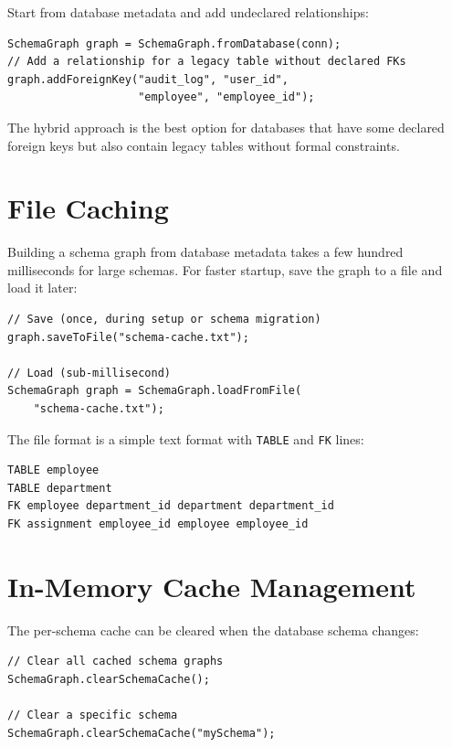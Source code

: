 Start from database metadata and add undeclared relationships:

\begin{lstlisting}[style=java]
SchemaGraph graph = SchemaGraph.fromDatabase(conn);
// Add a relationship for a legacy table without declared FKs
graph.addForeignKey("audit_log", "user_id",
                    "employee", "employee_id");
\end{lstlisting}

\begin{tipbox}
The hybrid approach is the best option for databases that have some declared foreign keys but also contain legacy tables without formal constraints.
\end{tipbox}

\section{File Caching}
\label{sec:sg-caching}

Building a schema graph from database metadata takes a few hundred milliseconds for large schemas.  For faster startup, save the graph to a file and load it later:

\begin{lstlisting}[style=java]
// Save (once, during setup or schema migration)
graph.saveToFile("schema-cache.txt");

// Load (sub-millisecond)
SchemaGraph graph = SchemaGraph.loadFromFile(
    "schema-cache.txt");
\end{lstlisting}

\noindent
The file format is a simple text format with \texttt{TABLE} and \texttt{FK} lines:

\begin{lstlisting}
TABLE employee
TABLE department
FK employee department_id department department_id
FK assignment employee_id employee employee_id
\end{lstlisting}

\section{In-Memory Cache Management}
\label{sec:sg-cache-mgmt}

The per-schema cache can be cleared when the database schema changes:

\begin{lstlisting}[style=java]
// Clear all cached schema graphs
SchemaGraph.clearSchemaCache();

// Clear a specific schema
SchemaGraph.clearSchemaCache("mySchema");
\end{lstlisting}

